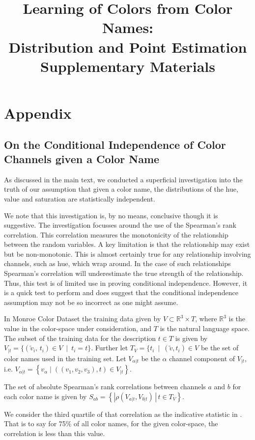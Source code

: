 \documentclass[11pt,a4paper]{article}
\title{Learning of Colors from Color Names: \\ Distribution and Point Estimation\\Supplementary Materials}
\author{}
\date{}
\begin{document}
\section{Appendix}

\subsection{On the Conditional Independence of Color Channels given a Color Name}\label{sec:corrind}

As discussed in the main text, we conducted a superficial investigation into the truth of our assumption that given a color name, the distributions of the hue, value and saturation are statistically independent.

We note that this investigation is, by no means, conclusive though it is suggestive.
The investigation focusses around the use of the Spearman's rank correlation.
This correlation measures the monotonicity of the relationship between the random variables.
A key limitation is that the relationship may exist but be non-monotonic.
This is almost certainly true for any relationship involving channels, such as hue, which wrap around.
In the case of such relationships Spearman's correlation will underestimate the true strength of the relationship.
Thus, this test is of limited use in proving conditional independence.
However, it is a quick test to perform and does suggest that the conditional independence assumption may not be so incorrect as one might assume.


In Monroe Color Dataset the training data  given by $V \subset \mathbb{R}^{3}\times T$, where $\mathbb{R}^{3}$ is the value in the color-space under consideration, and $T$ is the natural language space.
The subset of the training data for the description $t \in T$ is given by
$V_{|t}=\{(\tilde{v}_i,\,t_i) \in V \: \mid \: t_{i}=t\}$.
Further let $T_V = \{t_i \: \mid \: (\tilde{v},t_i)\in V$ be the set of color names used in the training set.
Let $V_{\alpha|t}$ be the $\alpha$ channel component of $V_{|t}$, i.e. $V_{\alpha|t} = \left\lbrace v_\alpha \mid ((v_1,v_2,v_3), t) \in V_{|t} \right\rbrace$.

The set of absolute Spearman's rank correlations between channels $a$ and $b$ for each color name is given by
$S_{ab}=\left\lbrace \left|\rho(V_{a|t},V_{b|t})\,\right|\,t\in T_{V}\right\rbrace$.
\newpage

We consider the third quartile of that correlation as the indicative statistic in .
That is to say for 75\% of all color names, for the given color-space, the correlation is less than this value.
\end{document}
